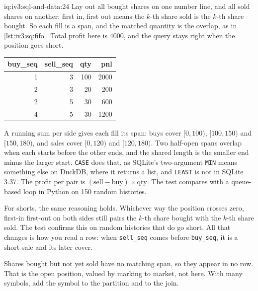 \begin{solution}{iq:iv3:sql-and-data:24}
Lay out all bought shares on one number line, and all sold shares on another: first in, first out means the $k$-th share sold is the $k$-th share bought. So each fill is a span, and the matched quantity is the overlap, as in \cref{lst:iv3:sq:fifo}. Total profit here is 4000, and the query stays right when the position goes short.
\label{lst:iv3:sq:fifo}
\begin{center}\small
\begin{tabular}{rrrr}
buy\_seq & sell\_seq & qty & pnl\\\hline
1 & 3 & 100 & 2000\\
2 & 3 & 20 & 200\\
2 & 5 & 30 & 600\\
4 & 5 & 30 & 1200
\end{tabular}
\end{center}
A running sum per side gives each fill its span: buys cover $[0, 100)$, $[100, 150)$ and $[150, 180)$, and sales cover $[0, 120)$ and $[120, 180)$. Two half-open spans overlap when each starts before the other ends, and the shared length is the smaller end minus the larger start. \texttt{CASE} does that, as SQLite's two-argument \texttt{MIN} means something else on DuckDB, where it returns a list, and \texttt{LEAST} is not in SQLite 3.37. The profit per pair is $(\text{sell} - \text{buy}) \times \text{qty}$. The test compares with a queue-based loop in Python on 150 random histories.

For shorts, the same reasoning holds. Whichever way the position crosses zero, first-in first-out on both sides still pairs the $k$-th share bought with the $k$-th share sold. The test confirms this on random histories that do go short. All that changes is how you read a row: when \texttt{sell\_seq} comes before \texttt{buy\_seq}, it is a short sale and its later cover.

Shares bought but not yet sold have no matching span, so they appear in no row. That is the open position, valued by marking to market, not here. With many symbols, add the symbol to the partition and to the join.

\end{solution}

